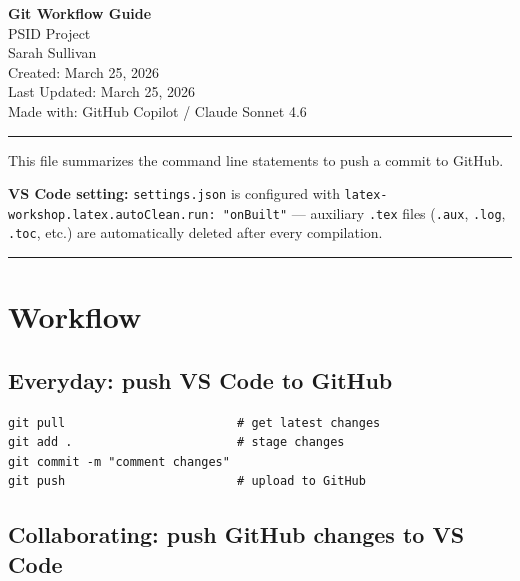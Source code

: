 \documentclass[11pt]{article}
\begin{document}
\begin{center}
  {\LARGE\bfseries Git Workflow Guide}\\[4pt]
  {\large PSID Project}\\[10pt]
  {\normalsize Sarah Sullivan}\\[4pt]
  {\small Created: March 25, 2026}\\[4pt]
  {\small Last Updated: March 25, 2026}\\[4pt]
  {\small Made with: GitHub Copilot / Claude Sonnet 4.6}
\end{center}

\vspace{4pt}
\textcolor{sectionrule}{\hrule}
\vspace{10pt}

This file summarizes the command line statements to push a commit to GitHub.

\smallskip
\noindent\colorbox{codebg}{\parbox{\dimexpr\linewidth-2\fboxsep}{\small\textbf{VS Code setting:} \texttt{settings.json} is configured with \texttt{latex-workshop.latex.autoClean.run: "onBuilt"} --- auxiliary \texttt{.tex} files (\texttt{.aux}, \texttt{.log}, \texttt{.toc}, etc.) are automatically deleted after every compilation.}}

\vspace{6pt}
\tableofcontents
\vspace{12pt}
\textcolor{sectionrule}{\hrule}
\vspace{6pt}

\section{Workflow}

\subsection{Everyday: push VS Code to GitHub}

\begin{lstlisting}[style=bash]
git pull                        # get latest changes
git add .                       # stage changes
git commit -m "comment changes"
git push                        # upload to GitHub
\end{lstlisting}

\subsection{Collaborating: push GitHub changes to VS Code}
\end{document}

